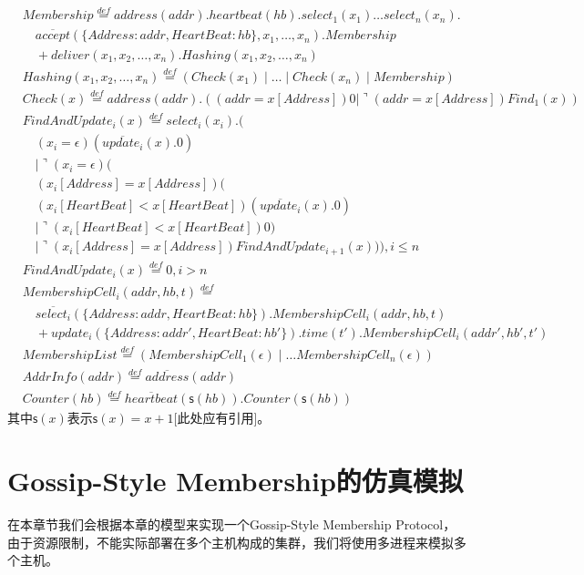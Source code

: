 \begin{align*}
    &Membership\stackrel{def}{=}address(addr).heartbeat(hb).select_1(x_1)\dots select_n(x_n).\\
    &\quad\overline{accept}(\{Address:addr,HeartBeat:hb\},x_1,\dots,x_n).Membership\\
    &\quad+deliver(x_1,x_2,\dots,x_n).Hashing(x_1,x_2,\dots,x_n)\\
    &Hashing(x_1,x_2,\dots,x_n)\stackrel{def}{=}(Check(x_1)\mid  \dots \mid Check(x_n) \mid Membership)\\
    &Check(x)\stackrel{def}{=}address(addr).((addr=x[Address])0|\urcorner(addr=x[Address])Find_1(x))\\
    &FindAndUpdate_i(x)\stackrel{def}{=}select_i(x_i).(\\
    &\quad(x_i = \epsilon) (\overline{update_i}(x).0)\\
    &\quad| \urcorner(x_i = \epsilon)(\\
    &\quad(x_i[Address]=x[Address])(\\
    &\quad(x_i[HeartBeat]<x[HeartBeat])(\overline{update_i}(x).0)\\
    &\quad\mid \urcorner (x_i[HeartBeat]<x[HeartBeat])0)\\
    &\quad\mid \urcorner (x_i[Address]=x[Address])FindAndUpdate_{i+1}(x))),i\leq n\\
    &FindAndUpdate_i(x)\stackrel{def}{=}0,i>n
   \end{align*}
   \begin{align*}
    &MembershipCell_i(addr,hb,t)\stackrel{def}{=}\\
    &\quad\overline{select_i}(\{Address:addr,HeartBeat:hb\}).MembershipCell_i(addr,hb,t)\\
    &\quad+update_i(\{Address:addr',HeartBeat:hb'\}).time(t').MembershipCell_i(addr',hb',t')\\
    &MembershipList\stackrel{def}{=}(MembershipCell_1(\epsilon)\mid \dots MembershipCell_n(\epsilon))\\
    &AddrInfo(addr)\stackrel{def}{=}\overline{address}(addr)\\
    &Counter(hb)\stackrel{def}{=}\overline{heartbeat}(\mathsf{s}(hb)).Counter(\mathsf{s}(hb))
\end{align*}
其中$\mathsf{s}(x)$表示$\mathsf{s}(x)=x+1$[此处应有引用]。
\section{Gossip-Style Membership的仿真模拟}
在本章节我们会根据本章的模型来实现一个Gossip-Style Membership Protocol，
由于资源限制，不能实际部署在多个主机构成的集群，我们将使用多进程来模拟多个主机。

